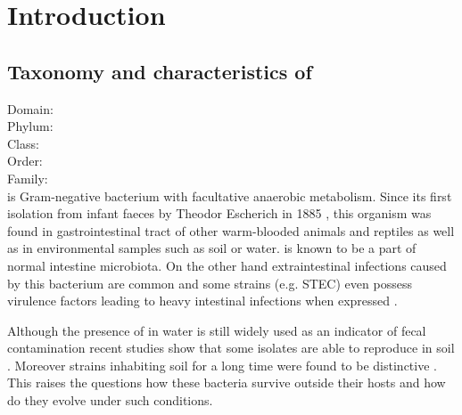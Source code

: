 \renewcommand{\chaptername}{Introduction}
\chapter*{Introduction}
\setcounter{page}{1}


\shorthandoff{-} 

\section{Taxonomy and characteristics of }
\hspace*{0,5cm} Domain: \hspace{0,5cm} \\%
\hspace*{1,5cm} Phylum: \hspace{0,5cm} \\%
\hspace*{2,5cm} Class: \hspace{0,5cm} \\%
\hspace*{3,5cm} Order: \hspace{0,5cm} \\%
\hspace*{4,5cm} Family: \hspace{0,5cm} \\%

 is Gram-negative bacterium with facultative anaerobic metabolism.
Since its first isolation from infant faeces by Theodor Escherich in 1885 \cite{friedmann2006escherich}, this organism was found in gastrointestinal tract of other warm-blooded animals and reptiles \cite{gopee2000longitudinal} as well as in environmental samples such as soil or water.
 is known to be a part of normal intestine microbiota.
On the other hand extraintestinal infections caused by this bacterium are common and some strains (e.g. STEC) even possess virulence factors leading to heavy intestinal infections when expressed \cite{allocati2013escherichia}.


Although the presence of  in water is still widely used as an indicator of fecal contamination recent studies show that some  isolates are able to  reproduce in soil \cite{byappanahalli2004indigenous, somorin2016general}.
Moreover strains inhabiting soil for a long time were found to be distinctive \cite{walk2009cryptic, walk2015cryptic}.
This raises the questions how these bacteria survive outside their hosts and how do they evolve under such conditions.


